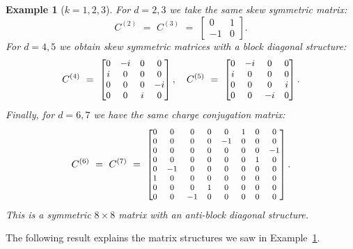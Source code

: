 \documentclass[english]{ourlematema}
\numberwithin{theorem}{section}
\newtheorem{example}[theorem]{Example}
\theoremstyle{definition}
\begin{document}
\begin{example}[$k = 1,2,3$] \label{ex:Cmatrix}
    For $d = 2,3$ we take the same  skew symmetric matrix:
        $$
    C^{(2)} \,\,= \,\,C^{(3)}\,\, = \,\,\begin{bmatrix}
        0 & 1\\
        -1 & 0
    \end{bmatrix}.
    $$
    For $d = 4,5$ we obtain skew symmetric matrices with a block diagonal structure:
    $$
    C^{(4)} \,\,= \,\,\begin{small} \begin{bmatrix}
        0 & -i & 0 & 0\\
        i & 0 & 0 & 0\\
        0 & 0 & 0 & -i\\
        0 & 0 & i & 0
    \end{bmatrix}, \end{small} \quad C^{(5)} \,\,=\,\,
       \begin{small} \begin{bmatrix}
        0 & -i & 0 & 0\\
        i & 0 & 0 & 0\\
        0 & 0 & 0 & i\\
        0 & 0 & -i & 0
    \end{bmatrix}. \end{small}
    $$
    Finally, for $d = 6,7$ we have the same charge conjugation matrix:
      $$
    C^{(6)} \,\,= \,\,C^{(7)} \,\, =\,\,
    \begin{footnotesize} \begin{bmatrix}
        0 & 0 & 0 & 0 & 0 & 1 & 0 & 0\\
        0 & 0 & 0 & 0 & -1 & 0 & 0 & 0\\
        0 & 0 & 0 & 0 & 0 & 0 & 0 & -1\\
        0 & 0 & 0 & 0 & 0 & 0 & 1 & 0\\
        0 & -1 & 0 & 0 & 0 & 0 & 0 & 0\\
        1 & 0 & 0 & 0 & 0 & 0 & 0 & 0\\
        0 & 0 & 0 & 1 & 0 & 0 & 0 & 0\\
        0 & 0 & -1 & 0 & 0 & 0 & 0 & 0
    \end{bmatrix}. \end{footnotesize}
    $$ 
     This is a symmetric $8 \times 8$ matrix with an 
    anti-block diagonal structure.
\end{example}

The following result explains the matrix structures we saw
in Example~\ref{ex:Cmatrix}.
\end{document}
